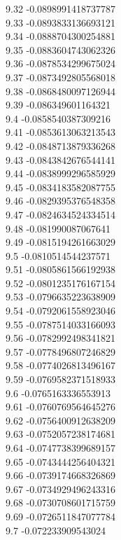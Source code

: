 {9.32	-0.0898991418737787\\
9.33	-0.0893833136693121\\
9.34	-0.0888704300254881\\
9.35	-0.0883604743062326\\
9.36	-0.0878534299675024\\
9.37	-0.0873492805568018\\
9.38	-0.0868480097126944\\
9.39	-0.086349601164321\\
9.4	-0.0858540387309216\\
9.41	-0.0853613063213543\\
9.42	-0.0848713879336268\\
9.43	-0.0843842676544141\\
9.44	-0.0838999296585929\\
9.45	-0.0834183582087755\\
9.46	-0.0829395376548358\\
9.47	-0.0824634524334514\\
9.48	-0.081990087067641\\
9.49	-0.0815194261663029\\
9.5	-0.0810514544237571\\
9.51	-0.0805861566192938\\
9.52	-0.0801235176167154\\
9.53	-0.0796635223638909\\
9.54	-0.0792061558923046\\
9.55	-0.0787514033166093\\
9.56	-0.0782992498341821\\
9.57	-0.0778496807246829\\
9.58	-0.0774026813496167\\
9.59	-0.0769582371518933\\
9.6	-0.0765163336553913\\
9.61	-0.0760769564645276\\
9.62	-0.0756400912638209\\
9.63	-0.0752057238174681\\
9.64	-0.0747738399689157\\
9.65	-0.0743444256404321\\
9.66	-0.0739174668326869\\
9.67	-0.0734929496243316\\
9.68	-0.0730708601715759\\
9.69	-0.0726511847077784\\
9.7	-0.072233909543024\\
}
